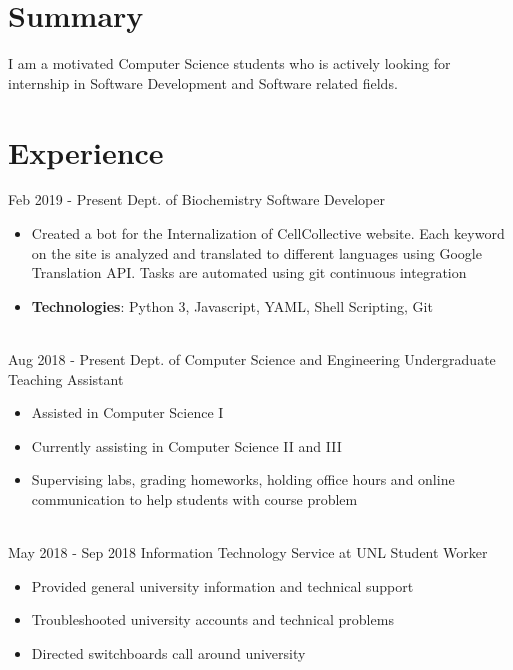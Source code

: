 \documentclass[letterpaper]{twentysecondcv} %
\begin{document}
\makeprofile %
 \section{Summary}
    I am a motivated Computer Science students who is actively looking for internship in Software Development and Software related fields.

\section{Experience}



\begin{twenty} %
\twentyitem
    	{Feb 2019 -}
    	{Present}
        {Dept. of Biochemistry}
        {}
        {Software Developer}
        {\begin{itemize}
            \item Created a bot for the Internalization of CellCollective website. Each keyword on the site is analyzed and translated to different languages using Google Translation API. Tasks are automated using git continuous integration
            \item \textbf{Technologies}: Python 3, Javascript, YAML, Shell Scripting, Git
        \end{itemize}
        }
        \\
\twentyitem
    	{Aug 2018 -}
		{Present}
        {Dept. of Computer Science and Engineering}
        {}
        {Undergraduate Teaching Assistant}
        {\begin{itemize}
        \item Assisted in Computer Science I
        \item Currently assisting in Computer Science II and III
        \item Supervising labs, grading homeworks, holding office hours and online communication to help students with course problem
        \end{itemize}
        }
        \\
\twentyitem
	{May 2018 -}
	{Sep 2018}
    {Information Technology Service at UNL}
    {}
    {Student Worker}
    {
    {\begin{itemize}
    \item Provided general university information and technical support
    \item Troubleshooted university accounts and technical problems
    \item Directed switchboards call around university
    \end{itemize}}
    }
    
        
\end{twenty}
\end{document}
